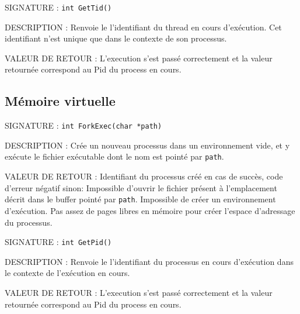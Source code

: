 \documentclass{article}
\begin{document}
		\vspace{2.5mm}
		\begin{description}
			\item{SIGNATURE : } \texttt{int GetTid()}
			\item{DESCRIPTION : Renvoie le l'identifiant du thread en cours d'exécution. Cet identifiant n'est unique que dans le contexte de son processus.} 
			\item{VALEUR DE RETOUR : }
				 L'execution s'est passé correctement et la valeur retournée correspond au Pid du process en cours.
				\subitem{\texttt{} : }
		\end{description}
	\subsection{Mémoire virtuelle}
		\begin{description}
			\item{SIGNATURE : } \texttt{int ForkExec(char *path)}
			\item{DESCRIPTION : } Crée un nouveau processus dans un environnement vide, et y exécute le fichier exécutable dont le nom est pointé par \texttt{path}.
			\item{VALEUR DE RETOUR : } Identifiant du processus créé en cas de succès, code d'erreur négatif sinon:
				 Impossible d'ouvrir le fichier présent à l'emplacement décrit dans le buffer pointé par \texttt{path}.
				 Impossible de créer un environnement d'exécution.
				 Pas assez de pages libres en mémoire pour créer l'espace d'adressage du processus.
		\end{description}
		\vspace{2.5mm}
		\begin{description}
			\item{SIGNATURE : } \texttt{int GetPid()}
			\item{DESCRIPTION : } Renvoie le l'identifiant du processus en cours d'exécution dans le contexte de l'exécution en cours.
			\item{VALEUR DE RETOUR : }
				 L'execution s'est passé correctement et la valeur retournée correspond au Pid du process en cours.
				\subitem{\texttt{} : }
		\end{description}
		
\end{document}
